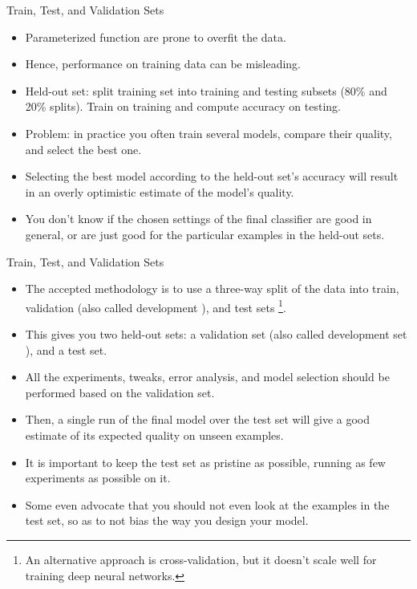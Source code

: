 \documentclass[handout]{beamer}
\begin{document}
\begin{frame}{Train, Test, and Validation Sets}
\begin{scriptsize}
\begin{itemize}
\item Parameterized function are prone to overfit the data.
\item Hence, performance on training data can be misleading.
\item Held-out set: split training set into training and testing subsets (80\% and 20\% splits). Train on training and compute accuracy on testing.
\item Problem: in practice you often train several models, compare their quality, and select the best one. 
\item Selecting the best model according to the held-out set's accuracy will result in an overly optimistic estimate of the model's quality.
\item You don't know if the chosen settings of the final classifier are good in general, or are just good for the particular examples in the held-out sets.

\end{itemize}
\end{scriptsize}
\end{frame}


\begin{frame}{Train, Test, and Validation Sets}
\begin{scriptsize}
\begin{itemize}
\item The accepted methodology is to use a three-way split of the data into train, validation (also called development ), and test sets \footnote{An alternative approach is cross-validation, but it doesn't scale well for training deep neural networks.}. 
\item This gives you two held-out sets: a validation set (also called development set ), and a test set.
\item All the experiments, tweaks, error analysis, and model selection should be performed based on the validation set. 
\item Then, a single run of the final model over the test set will give a good estimate of its expected quality on unseen examples. 
\item It is important to keep the test set as pristine as possible, running as few experiments as possible on it. 
\item Some even advocate that you should not even look at the examples in the test
set, so as to not bias the way you design your model.



\end{itemize}

\end{scriptsize}
\end{frame}
\end{document}
